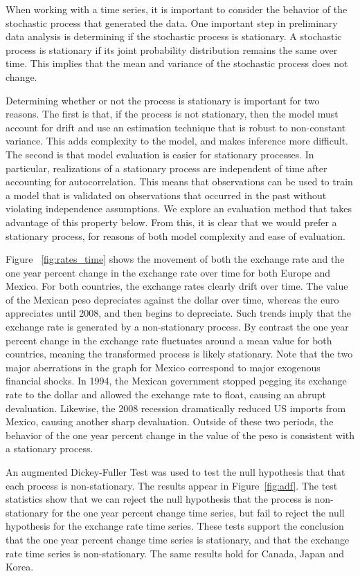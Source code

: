 \documentclass{sig-alternate-05-2015}
\begin{document}
When working with a time series, it is important to consider the behavior of the stochastic process that generated the data. One important step in preliminary data analysis is determining if the stochastic process is stationary. A stochastic process is stationary if its joint probability distribution remains the same over time. This implies that the mean and variance of the stochastic process does not change.
\par{} Determining whether or not the process is stationary is important for two reasons. The first is that, if the process is not stationary, then the model must account for drift and use an estimation technique that is robust to non-constant variance. This adds complexity to the model, and makes inference more difficult. The second is that model evaluation is easier for stationary processes. In particular, realizations of a stationary process are independent of time after accounting for autocorrelation. This means that observations can be used to train a model that is validated on observations that occurred in the past without violating independence assumptions. We explore an evaluation method that takes advantage of this property below. From this, it is clear that we would prefer a stationary process, for reasons of both model complexity and ease of evaluation.
\par{} Figure ~\ref{fig:rates_time} shows the movement of both the exchange rate and the one year percent change in the exchange rate over time for both Europe and Mexico. For both countries, the exchange rates clearly drift over time. The value of the Mexican peso depreciates against the dollar over time, whereas the euro appreciates until 2008, and then begins to depreciate. Such trends imply that the exchange rate is generated by a non-stationary process. By contrast the one year percent change in the exchange rate fluctuates around a mean value for both countries, meaning the transformed process is likely stationary. Note that the two major aberrations in the graph for Mexico correspond to major exogenous financial shocks. In 1994, the Mexican government stopped pegging its exchange rate to the dollar and allowed the exchange rate to float, causing an abrupt devaluation. Likewise, the 2008 recession dramatically reduced US imports from Mexico, causing another sharp devaluation. Outside of these two periods, the behavior of the one year percent change in the value of the peso is consistent with a stationary process.
\par{} An augmented Dickey-Fuller Test was used to test the null hypothesis that that each process is non-stationary. The results appear in Figure~\ref{fig:adf}. The test statistics show that we can reject the null hypothesis that the process is non-stationary for the one year percent change time series, but fail to reject the null hypothesis for the exchange rate time series. These tests support the conclusion that the one year percent change time series is stationary, and that the exchange rate time series is non-stationary. The same results hold for Canada, Japan and Korea.
\end{document}
